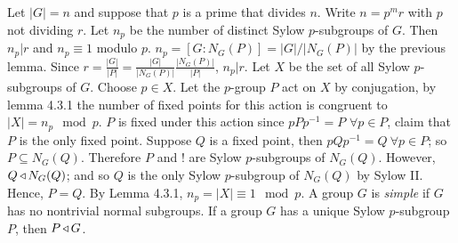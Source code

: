 % 
 Let $|G| = n$ and suppose that $p$ is a prime that divides $n$. Write $n = p^m r$ with $p$ not dividing $r$. Let $n_p$ be the number of distinct Sylow $p$-subgroups of $G$. Then $n_p | r$ and $n_p \equiv 1$ modulo $p$. 
\wpf{} $n_p = [G: N_G(P)] = |G|/|N_G(P)|$ by the previous lemma. Since $r = \frac{|G|}{|P|} = \frac{|G|}{|N_G(P)|}\frac{|N_G(P)|}{|P|}$, $n_p | r$. Let $X$ be the set of all Sylow $p$-subgroups of $G$. Choose $p \in X$. Let the $p$-group $P$ act on $X$ by conjugation, by lemma 4.3.1 the number of fixed points for this action is congruent to $|X| = n_p \mod p$. 
$P$ is fixed under this action since $pPp^{-1} = P$ $\forall p \in P$, claim that $P$ is the only fixed point.
Suppose $Q$ is a fixed point, then $pQp^{-1} = Q\ \forall p \in P$; so $P \subseteq N_G(Q)$. Therefore $P$ and $!$ are Sylow $p$-subgroups of $N_G(Q)$. However, $Q \operatorname{\triangleleft} N_G(Q)$; and so $Q$ is the only Sylow $p$-subgroup of $N_G(Q)$ by Sylow II. Hence, $P = Q$. 
By Lemma 4.3.1, $n_p = |X| \equiv 1 \mod p$.
%
  A group $G$ is \textit{simple} if $G$ has no nontrivial normal subgroups.
 If a group $G$ has a unique Sylow $p$-subgroup $P$, then $P \operatorname{\triangleleft} G$.